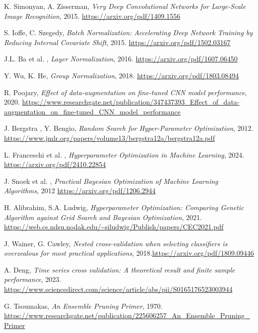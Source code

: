 \documentclass[a4paper,12pt]{report}
\begin{document}
\begin{thebibliography}{99}
		K. Simonyan, A. Zisserman, \emph{Very Deep Convolutional Networks for Large-Scale Image Recognition}, 2015. \url{https://arxiv.org/pdf/1409.1556}
		
		S. Ioffe, C. Szegedy, \emph{Batch Normalization: Accelerating Deep Network Training by Reducing Internal Covariate Shift}, 2015. \url{https://arxiv.org/pdf/1502.03167}
		
		J.L. Ba et al. , \emph{Layer Normalization}, 2016. \url{https://arxiv.org/pdf/1607.06450}
		
		Y. Wu, K. He, \emph{Group Normalization}, 2018. \url{https://arxiv.org/pdf/1803.08494}
		
		R. Poojary, \emph{Effect of data-augmentation on fine-tuned CNN model performance}, 2020. \url{https://www.researchgate.net/publication/347437393_Effect_of_data-augmentation_on_fine-tuned_CNN_model_performance}
		
		J. Bergstra , Y. Bengio, \emph{Random Search for Hyper-Parameter Optimization}, 2012. \url{https://www.jmlr.org/papers/volume13/bergstra12a/bergstra12a.pdf}
		
		L. Franceschi et al. , \emph{Hyperparameter Optimization in Machine Learning}, 2024. \url{https://arxiv.org/pdf/2410.22854}
		
		J. Snoek et al. , \emph{Practical Bayesian Optimization of Machine Learning Algorithms}, 2012 \url{https://arxiv.org/pdf/1206.2944}
		
		H. Alibrahim, S.A. Ludwig, \emph{Hyperparameter Optimization: Comparing Genetic Algorithm against Grid Search and Bayesian Optimization}, 2021. \url{https://web.cs.ndsu.nodak.edu/~siludwig/Publish/papers/CEC2021.pdf}
		 
		J. Wainer, G. Cawley, \emph{Nested cross-validation when selecting classifiers is overzealous for most practical applications}, 2018.\url{https://arxiv.org/pdf/1809.09446}
		 
		A. Deng, \emph{Time series cross validation: A theoretical result and finite sample performance}, 2023. \url{https://www.sciencedirect.com/science/article/abs/pii/S0165176523003944}
		 
		G. Tsoumakas, \emph{An Ensemble Pruning Primer}, 1970. \url{https://www.researchgate.net/publication/225606257_An_Ensemble_Pruning_Primer}
		 

\end{thebibliography}
\end{document}
